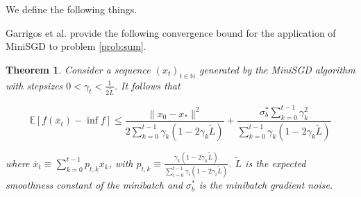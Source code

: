 \documentclass[12pt]{article}
\newtheorem{theorem}{Theorem}
\begin{document}
We define the following things.


Garrigos et al. \cite{gd} provide the following convergence bound for the application of MiniSGD to problem \ref{prob:sum}.

\begin{theorem}
    Consider a sequence $(x_t)_{t \in \mathbb{N}}$ generated by the MiniSGD algorithm with stepsizes $0 < \gamma_t < \frac{1}{2 \tilde{L}}$. It follows that

    \begin{equation}
        \mathbb{E}[f(\overline{x}_t) - \inf f] \leq \frac{\|x_0 - x_*\|^2}{2 \sum_{k=0}^{t-1} \gamma_k(1-2\gamma_k \tilde{L})} + \frac{\sigma_b^* \sum_{k=0}^{t-1} \gamma_k^2}{\sum_{k=0}^{t-1} \gamma_k (1 - 2 \gamma_k \tilde{L})} 
    \end{equation}

    where $\overline{x}_t \equiv \sum_{k=0}^{t-1} p_{t,k} x_k$, with $p_{t,k} \equiv \frac{\gamma_k (1 - 2 \gamma_k \tilde{L})}{\sum_{i=0}^{t-1} \gamma_i (1 - 2 \gamma_i \tilde{L})}$. $\tilde{L}$ is the expected smoothness constant of the minibatch and $\sigma_b^*$ is the minibatch gradient noise.
\end{theorem}



\end{document}
